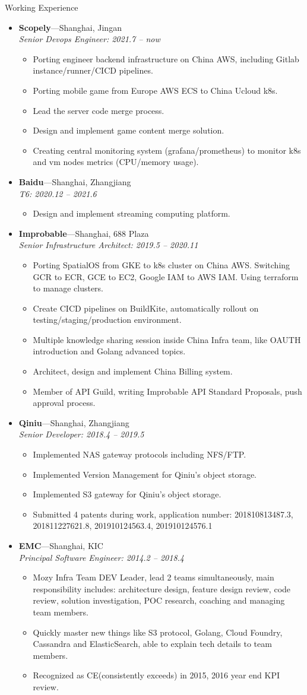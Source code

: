 \documentclass[11pt,oneside]{article}
\newenvironment{ressection}[1]{
	\vspace{4pt}
	{\selectfont\Large#1}
	\begin{itemize}
	\vspace{3pt}
}{
	\end{itemize}
}
\newcommand{\ressubitem}[1]{
	\vspace{-1pt}
	\item \begin{flushleft} #1 \end{flushleft}
}
\newcommand{\resbigitem}[3]{
	\vspace{-5pt}
	\item
	\textbf{#1}---#2 \\
	\textit{#3}
}
\newenvironment{ressubsec}[3]{
	\resbigitem{#1}{#2}{#3}
	\vspace{-2pt}
	\begin{itemize}
}{
    \end{itemize}
}
\begin{document}
\begin{ressection}{Working Experience}

	\begin{ressubsec}{Scopely}{Shanghai, Jingan}{Senior Devops Engineer: 2021.7 -- now}
		\ressubitem{Porting engineer backend infrastructure on China AWS, including Gitlab instance/runner/CICD pipelines.}
		\ressubitem{Porting mobile game from Europe AWS ECS to China Ucloud k8s.}
		\ressubitem{Lead the server code merge process.}
		\ressubitem{Design and implement game content merge solution.}
		\ressubitem{Creating central monitoring system (grafana/prometheus) to monitor k8s and vm nodes metrics (CPU/memory usage).}
	\end{ressubsec}

	\begin{ressubsec}{Baidu}{Shanghai, Zhangjiang}{T6: 2020.12 -- 2021.6}
		\ressubitem{Design and implement streaming computing platform.}
	\end{ressubsec}

	\begin{ressubsec}{Improbable}{Shanghai, 688 Plaza}{Senior Infrastructure Architect: 2019.5 -- 2020.11}
		\ressubitem{Porting SpatialOS from GKE to k8s cluster on China AWS. Switching GCR to ECR, GCE to EC2, Google IAM to AWS IAM. Using terraform to manage clusters.}
		\ressubitem{Create CICD pipelines on BuildKite, automatically rollout on testing/staging/production environment.}
		\ressubitem{Multiple knowledge sharing session inside China Infra team, like OAUTH introduction and Golang advanced topics.}
		\ressubitem{Architect, design and implement China Billing system.}
		\ressubitem{Member of API Guild, writing Improbable API Standard Proposals, push approval process.}
	\end{ressubsec}

	\begin{ressubsec}{Qiniu}{Shanghai, Zhangjiang}{Senior Developer: 2018.4 -- 2019.5}
		\ressubitem{Implemented NAS gateway protocols including NFS/FTP.}
		\ressubitem{Implemented Version Management for Qiniu's object storage.}
		\ressubitem{Implemented S3 gateway for Qiniu's object storage.}
		\ressubitem{Submitted 4 patents during work, application number: 201810813487.3, 201811227621.8, 201910124563.4, 201910124576.1}
	\end{ressubsec}

	\begin{ressubsec}{EMC}{Shanghai, KIC}{Principal Software Engineer: 2014.2 -- 2018.4}
		\ressubitem{Mozy Infra Team DEV Leader, lead 2 teams simultaneously, main responsibility includes: architecture design, feature design review, code review, solution investigation, POC research, coaching and managing team members.}
		\ressubitem{Quickly master new things like S3 protocol, Golang, Cloud Foundry, Cassandra and ElasticSearch, able to explain tech details to team members.}
		\ressubitem{Recognized as CE(consistently exceeds) in 2015, 2016 year end KPI review.}
	\end{ressubsec}


\end{ressection}
\end{document}
